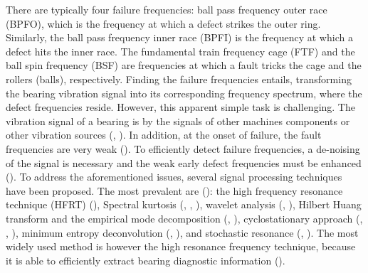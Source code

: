 \documentclass[../Main/thesis.tex]{subfiles}
\begin{document}
\justify
There are typically four failure frequencies: ball pass frequency outer race (BPFO), which is the frequency at which a defect strikes the outer ring. Similarly, the ball pass frequency inner race (BPFI) is the frequency at which a defect hits the inner race. The fundamental train frequency cage (FTF) and the ball spin frequency (BSF) are frequencies at which a fault tricks the cage and the rollers (balls), respectively.
\justify
Finding the failure frequencies entails, transforming the bearing vibration signal into its corresponding frequency spectrum, where the defect frequencies reside. However, this apparent simple task is challenging. The vibration signal of a bearing is  by the signals of other machines components or other vibration sources (\cite{zhao2014}, \cite{mcfadden1984a}). In addition, at the onset of failure, the fault frequencies are very weak (\cite{zhao2014}). To efficiently detect failure frequencies, a de-noising of the signal is necessary and the weak early defect frequencies must be enhanced (\cite{zhao2014}). 
\justify
To address the aforementioned issues, several signal processing techniques have been proposed. The most prevalent are (\cite{zhao2014}): the high frequency resonance technique (HFRT) (\cite{darlow1974}), Spectral kurtosis (\cite{antoni2006a}, \cite{antoni2006b}, \cite{antoni2007}), wavelet analysis (\cite{lin2000}, \cite{qiu2006}), Hilbert Huang transform and the empirical mode decomposition (\cite{yu2005}, \cite{lei2011}), cyclostationary approach (\cite{antoni2004}, \cite{borghesani2013}, \cite{girondin2013}), minimum entropy deconvolution (\cite{sawalhi2007}, \cite{jiang2013} ), and stochastic resonance (\cite{tan2009}, \cite{he2012}). The most widely used method is however the high resonance frequency technique, because it is able to efficiently extract bearing diagnostic information (\cite{zhao2014}).
\end{document}
